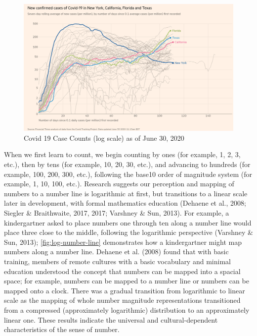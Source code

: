 \documentclass[print]{nuthesis}
\begin{document}
\begin{figure}[tbp]

{\centering \includegraphics[width=0.9\linewidth,]{images/covid19-FT-case-count-06.30.2020-log} 

}

\caption{Covid 19 Case Counts (log scale) as of June 30, 2020}\label{fig:covid19-FT-june2020-case-counts-log}
\end{figure}

When we first learn to count, we begin counting by ones (for example, 1, 2, 3, etc.), then by tens (for example, 10, 20, 30, etc.), and advancing to hundreds (for example, 100, 200, 300, etc.), following the base10 order of magnitude system (for example, 1, 10, 100, etc.).
Research suggests our perception and mapping of numbers to a number line is logarithmic at first, but transitions to a linear scale later in development, with formal mathematics education (Dehaene et al., 2008; Siegler \& Braithwaite, 2017, 2017; Varshney \& Sun, 2013).
For example, a kindergartner asked to place numbers one through ten along a number line would place three close to the middle, following the logarithmic perspective (Varshney \& Sun, 2013); \cref{fig:log-number-line} demonstrates how a kindergartner might map numbers along a number line.
Dehaene et al. (2008) found that with basic training, members of remote cultures with a basic vocabulary and minimal education understood the concept that numbers can be mapped into a spacial space; for example, numbers can be mapped to a number line or numbers can be mapped onto a clock.
There was a gradual transition from logarithmic to linear scale as the mapping of whole number magnitude representations transitioned from a compressed (approximately logarithmic) distribution to an approximately linear one.
These results indicate the universal and cultural-dependent characteristics of the sense of number.
\end{document}
